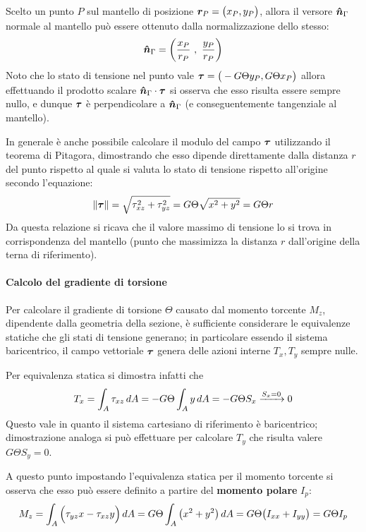     	\begin{dimostrazione}
    	    Scelto un punto $P$ sul mantello di posizione $\boldsymbol{r}_P=\big( x_P, y_P\big)$, allora il versore $\boldsymbol{\hat{n}}_\Gamma$ normale al mantello può essere ottenuto dalla normalizzazione dello stesso:
    	    \[ \boldsymbol{\hat{n}}_\Gamma = \left( \frac{x_P}{r_P} \ , \ \frac{y_P}{r_P} \right)  \]
    	    Noto che lo stato di tensione nel punto vale $\boldsymbol{\tau} = \big( - G\Theta y_P, G\Theta x_P\big)$ allora effettuando il prodotto scalare $\boldsymbol{\hat{n}}_\Gamma \cdot \boldsymbol{\tau}$ si osserva che esso risulta essere sempre nullo, e dunque $\boldsymbol{\tau}$ è perpendicolare a $\boldsymbol{\hat{n}}_\Gamma$ (e conseguentemente tangenziale al mantello).
    	\end{dimostrazione}
    	In generale è anche possibile calcolare il modulo del campo $\boldsymbol{\tau}$ utilizzando il teorema di Pitagora, dimostrando che esso dipende direttamente dalla distanza $r$ del punto rispetto al quale si valuta lo stato di tensione rispetto all'origine secondo l'equazione:
    	\[ \|\boldsymbol{\tau} \| = \sqrt{\tau_{xz} ^2 + \tau_{yz}^2} =G\Theta \sqrt{x^2+y^2}=G\Theta r \]
    	Da questa relazione si ricava che il valore massimo di tensione lo si trova in corrispondenza del mantello (punto che massimizza la distanza $r$ dall'origine della terna di riferimento).
    	
    	\paragraph{Calcolo del gradiente di torsione} Per calcolare il gradiente di torsione $\Theta$ causato dal momento torcente $M_z$, dipendente dalla geometria della sezione, è sufficiente considerare le equivalenze statiche che gli stati di tensione generano; in particolare essendo il sistema baricentrico, il campo vettoriale $\boldsymbol{\tau}$ genera delle azioni interne $T_x, T_y$ sempre nulle.
    	\begin{dimostrazione}
    		Per equivalenza statica si dimostra infatti che
    		\[ T_x = \int_A \tau_{xz} \, dA = -G\Theta\int_A y\, dA = - G\Theta S_x \xrightarrow{S_x = 0} 0 \]
    		Questo vale in quanto il sistema cartesiano di riferimento è baricentrico; dimostrazione analoga si può effettuare per calcolare $T_y$ che risulta valere $G\Theta S_y = 0$.
    	\end{dimostrazione}
    
    	A questo punto impostando l'equivalenza statica per il momento torcente si osserva che esso può essere definito a partire del \textbf{momento polare} $I_p$:
    	\[ M_z = \int_A \Big( \tau_{yz} x - \tau_{xz} y\Big)\, dA = G\Theta \int_A\big(x^2 + y^2\big)\, dA = G\Theta \big(I_{xx} + I_{yy}\big) = G\Theta I_p  \]
    	
